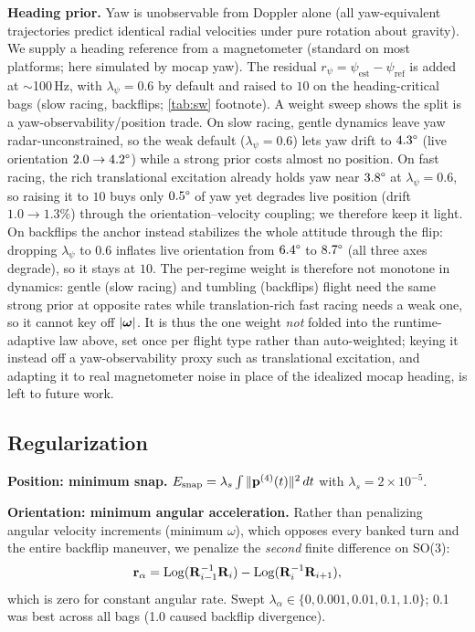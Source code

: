 \textbf{Heading prior.}
Yaw is unobservable from Doppler alone (all yaw-equivalent
trajectories predict identical radial velocities under pure
rotation about gravity).  We supply a heading reference from a magnetometer (standard on
most platforms; here simulated by \ac{mocap} yaw).  The residual $r_\psi = \psi_\text{est} - \psi_\text{ref}$
is added at $\sim$100\,Hz, with $\lambda_\psi = 0.6$ by default and
raised to $10$ on the heading-critical bags (slow racing, backflips;
\autoref{tab:sw} footnote).
A weight sweep shows the split is a yaw-observability/position trade.
On slow racing, gentle dynamics leave yaw radar-unconstrained, so the
weak default ($\lambda_\psi{=}0.6$) lets yaw drift to $4.3\degree$
(live orientation $2.0\to4.2\degree$) while a strong prior costs almost no
position.  On fast racing, the rich translational excitation already
holds yaw near $3.8\degree$ at $\lambda_\psi{=}0.6$, so raising it to
$10$ buys only $0.5\degree$ of yaw yet degrades live position
(drift $1.0\to1.3\%$) through the orientation--velocity coupling; we
therefore keep it light.  On backflips the anchor instead stabilizes the
whole attitude through the flip: dropping $\lambda_\psi$ to $0.6$ inflates
live orientation from $6.4\degree$ to $8.7\degree$ (all three axes
degrade), so it stays at $10$.  The per-regime weight is therefore not
monotone in dynamics: gentle (slow racing) and tumbling (backflips) flight
need the same strong prior at opposite rates while translation-rich fast
racing needs a weak one, so it cannot key off $|\boldsymbol{\omega}|$.  It is thus the one
weight \emph{not} folded into the runtime-adaptive law above, set once per
flight type rather than auto-weighted; keying it instead off a
yaw-observability proxy such as translational excitation, and adapting it to
real magnetometer noise in place of the idealized \ac{mocap} heading, is
left to future work.

\subsection{Regularization}
\label{sec:reg}

\textbf{Position: minimum snap.}
$E_{\text{snap}} = \lambda_s \int \|\mathbf{p}^{(4)}(t)\|^2\,dt$
with $\lambda_s = 2{\times}10^{-5}$.

\textbf{Orientation: minimum angular acceleration.}
Rather than penalizing angular velocity increments (minimum $\omega$),
which opposes every banked turn and the entire backflip maneuver, we
penalize the \emph{second} finite difference on SO(3):
\begin{equation}
  \mathbf{r}_\alpha = \mathrm{Log}(\mathbf{R}_{i-1}^{-1}\mathbf{R}_i)
                    - \mathrm{Log}(\mathbf{R}_i^{-1}\mathbf{R}_{i+1}),
  \label{eq:min_alpha}
\end{equation}
which is zero for constant angular rate.
Swept $\lambda_\alpha \in \{0, 0.001, 0.01, 0.1, 1.0\}$; 0.1
was best across all bags (1.0 caused backflip divergence).

